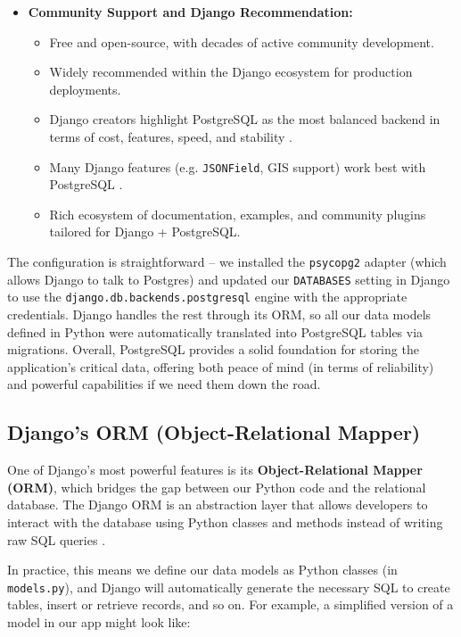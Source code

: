 \begin{itemize}
	\item \textbf{Community Support and Django Recommendation:} 
	\begin{itemize}
		\item Free and open-source, with decades of active community development. 
		\item Widely recommended within the Django ecosystem for production deployments. 
		\item Django creators highlight PostgreSQL as the most balanced backend in terms of cost, features, speed, and stability \parencite{DjangoDatabases,DjangoPostgresFields}. 
		\item Many Django features (e.g. \texttt{JSONField}, GIS support) work best with PostgreSQL \parencite{DjangoPostgresFields}. 
		\item Rich ecosystem of documentation, examples, and community plugins tailored for Django + PostgreSQL. 
	\end{itemize}
\end{itemize} 

The configuration is straightforward – we installed the \texttt{psycopg2} adapter (which allows Django to talk to Postgres) and updated our \texttt{DATABASES} setting in Django to use the \texttt{django.\allowbreak db.\allowbreak backends.\allowbreak postgresql} engine with the appropriate credentials. Django handles the rest through its ORM, so all our data models defined in Python were automatically translated into PostgreSQL tables via migrations. Overall, PostgreSQL provides a solid foundation for storing the application’s critical data, offering both peace of mind (in terms of reliability) and powerful capabilities if we need them down the road.

\subsection{Django’s ORM (Object-Relational Mapper)} 

One of Django’s most powerful features is its 
\textbf{Object-Relational Mapper (ORM)}, which bridges the gap between our 
Python code and the relational database. The Django ORM is an abstraction 
layer that allows developers to interact with the database using Python 
classes and methods instead of writing raw SQL queries \parencite{DjangoORMQueries}. 

In practice, this means we define our data models as Python classes (in 
\texttt{models.py}), and Django will automatically generate the necessary SQL 
to create tables, insert or retrieve records, and so on. For example, a 
simplified version of a model in our app might look like: 


